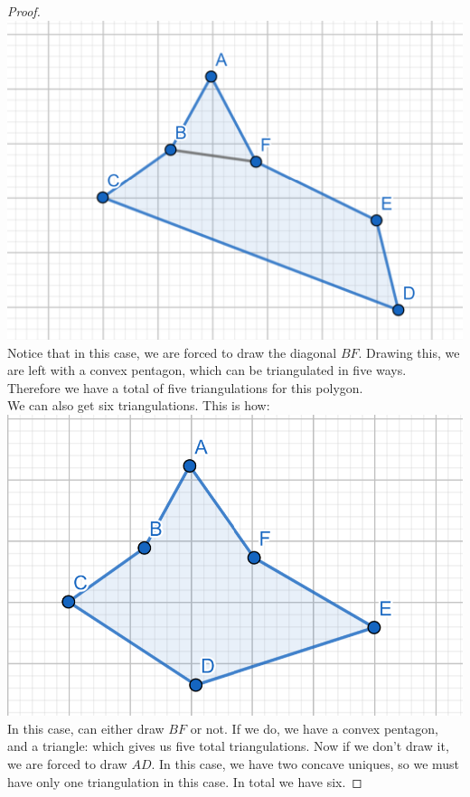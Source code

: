 \documentclass[12pt]{article}
\theoremstyle{definition}
\begin{document}
\begin{proof}
\includegraphics[scale=1]{five.png}\\

Notice that in this case, we are forced to draw the diagonal $BF$. Drawing this, we are left with a convex pentagon, which can be triangulated in five ways. Therefore we have a total of five triangulations for this polygon.\\


We can also get six triangulations. This is how:\\


\includegraphics[scale=1]{six.png} \\

In this case, can either draw $BF$ or not. If we do, we have a convex pentagon, and a triangle: which gives us five total triangulations. Now if we don't draw it, we are forced to draw $AD$. In this case, we have two concave uniques, so we must have only one triangulation in this case. In total we have six.

\end{proof}
\end{document}
